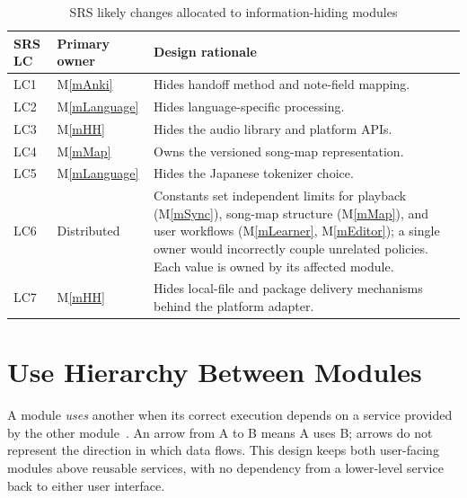 \documentclass[12pt, titlepage]{article}
\newcommand{\mref}[1]{M\ref{#1}}
\begin{document}
\begin{table}[H]
\centering
\begin{tabularx}{\textwidth}{@{}l l X@{}}
\toprule
\textbf{SRS LC} & \textbf{Primary owner} & \textbf{Design rationale}\\
\midrule
LC1 & \mref{mAnki} & Hides handoff method and note-field mapping.\\
LC2 & \mref{mLanguage} & Hides language-specific processing.\\
LC3 & \mref{mHH} & Hides the audio library and platform APIs.\\
LC4 & \mref{mMap} & Owns the versioned song-map representation.\\
LC5 & \mref{mLanguage} & Hides the Japanese tokenizer choice.\\
LC6 & Distributed & Constants set independent limits for playback
(\mref{mSync}), song-map structure (\mref{mMap}), and user workflows
(\mref{mLearner}, \mref{mEditor}); a single owner would incorrectly
couple unrelated policies. Each value is owned by its affected module.\\
LC7 & \mref{mHH} & Hides local-file and package delivery mechanisms
behind the platform adapter.\\
\bottomrule
\end{tabularx}
\caption{SRS likely changes allocated to information-hiding modules}
\label{TblLCT}
\end{table}

\section{Use Hierarchy Between Modules} \label{SecUse}

A module \emph{uses} another when its correct execution depends on a service
provided by the other module~\citep{Parnas1978}. An arrow from A to B means
A uses B; arrows do not represent the direction in which data flows. This
design keeps both user-facing modules above reusable services, with no
dependency from a lower-level service back to either user interface.
\end{document}
